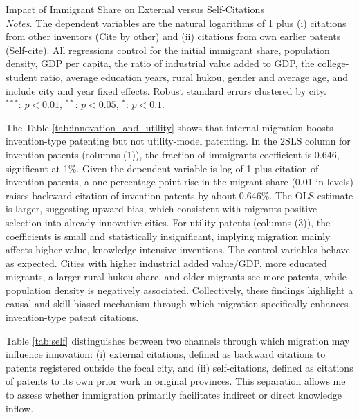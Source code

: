 \documentclass[12pt]{article}
\begin{document}
\begin{table}[!htbp]
  \centering 
  \resizebox{\textwidth}{!}{
    
  }
  \caption{Impact of Immigrant Share on External versus Self-Citations \vspace{1ex} \\ 
  {\footnotesize \emph{Notes.} The dependent variables are the natural logarithms of 1 plus (i) citations from other inventors (Cite by other) and (ii) citations from own earlier patents (Self-cite). All regressions control for the initial immigrant share, population density, GDP per capita, the ratio of industrial value added to GDP, the college-student ratio, average education years, rural hukou, gender and average age, and include city and year fixed effects. Robust standard errors clustered by city.
 \\ $^{***}$: $p < 0.01$, $^{**}$: $p < 0.05$, $^{*}$: $p < 0.1$.}}
 \label{tab:self}
\end{table}
The Table \ref{tab:innovation_and_utility} shows that internal migration boosts invention-type patenting but not utility-model patenting. In the 2SLS column for invention patents (columns (1)), the fraction of immigrants coefficient is 0.646, significant at 1\%. 
Given the dependent variable is log of 1 plus citation of invention patents, a one-percentage-point rise in the migrant share (0.01 in levels) raises backward citation of invention patents by about 0.646\%. The OLS estimate is larger, suggesting upward bias, which consistent with migrants positive selection into already innovative cities. 
For utility patents (columns (3)), the coefficients is small and statistically insignificant, implying migration mainly affects higher-value, knowledge-intensive inventions. The control variables behave as expected. Cities with higher industrial added value/GDP, more educated migrants, a larger rural-hukou share, and older migrants see more patents, while population density is negatively associated. Collectively, these findings highlight a causal and skill-biased mechanism through which migration specifically enhances invention-type patent citations.

Table \ref{tab:self} distinguishes between two channels through which migration may influence innovation: (i) external citations, defined as backward citations to patents registered outside the focal city, and (ii) self-citations, defined as citations of patents to its own prior work in original provinces. This separation allows me to assess whether immigration primarily facilitates indirect or direct knowledge inflow.
\end{document}
